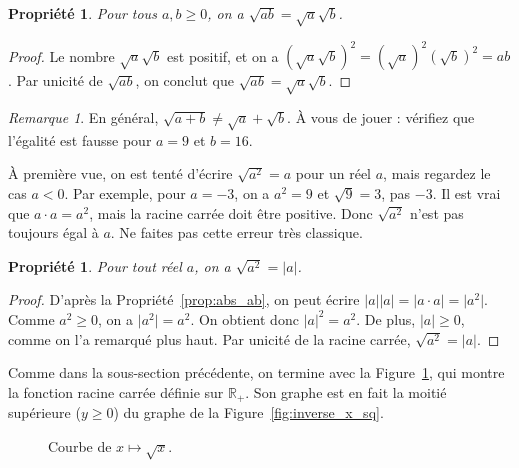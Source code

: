 \documentclass[12pt,a4paper]{article}
\theoremstyle{plain}
\newtheorem{property}[theorem]{Propriété}
\theoremstyle{definition}
\theoremstyle{remark}
\newtheorem*{remark}{Remarque}
\begin{document}
\begin{tcolorbox}[graybar]
  \begin{property}
    Pour tous $a, b \ge 0$, on a $\sqrt{ab} = \sqrt{a}\sqrt{b}$.
  \end{property}
\end{tcolorbox}

\begin{proof}
  Le nombre $\sqrt{a}\sqrt{b}$ est positif, et on a
  $(\sqrt{a}\sqrt{b})^2 = (\sqrt{a})^2(\sqrt{b})^2 = ab$.
  Par unicité de $\sqrt{ab}$, on conclut que $\sqrt{ab} = \sqrt{a}\sqrt{b}$.
\end{proof}

\begin{remark}
  En général, $\sqrt{a + b} \neq \sqrt{a} + \sqrt{b}$. À vous de jouer : vérifiez
  que l'égalité est fausse pour $a = 9$ et $b = 16$.
\end{remark}

À première vue, on est tenté d'écrire $\sqrt{a^2} = a$ pour un réel $a$, mais
regardez le cas $a < 0$. Par exemple, pour $a = -3$, on a $a^2 = 9$ et
$\sqrt{9} = 3$, pas $-3$. Il est vrai que $a \cdot a = a^2$, mais la racine carrée
doit être positive. Donc $\sqrt{a^2}$ n'est pas toujours égal à $a$.
Ne faites pas cette erreur très classique.

\begin{tcolorbox}[graybar]
  \begin{property}
    Pour tout réel $a$, on a $\sqrt{a^2} = \lvert a \rvert$.
  \end{property}
\end{tcolorbox}

\begin{proof}
  D'après la Propriété~\ref{prop:abs_ab}, on peut écrire
  $\lvert a \rvert \lvert a \rvert = \lvert a \cdot a \rvert = \lvert a^2 \rvert$.
  Comme $a^2 \ge 0$, on a $\lvert a^2 \rvert = a^2$. On obtient donc
  $\lvert a \rvert^2 = a^2$. De plus, $\lvert a \rvert \ge 0$, comme on l'a
  remarqué plus haut. Par unicité de la racine carrée, $\sqrt{a^2} = \lvert a \rvert$.
\end{proof}

Comme dans la sous-section précédente, on termine avec la
Figure~\ref{fig:sq_func}, qui montre la fonction racine carrée définie sur
$\mathbb{R}_+$. Son graphe est en fait la moitié supérieure ($y \ge 0$) du graphe
de la Figure~\ref{fig:inverse_x_sq}.

\begin{figure}[ht]
  \centering
  \caption{Courbe de $x \mapsto \sqrt{x}$.}
  \label{fig:sq_func}
\end{figure}
\end{document}
